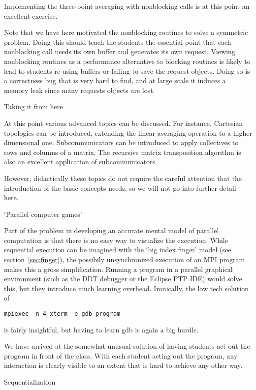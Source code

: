 Implementing the three-point averaging with nonblocking calls
is at this point an excellent exercise.

Note that we have here motivated the nonblocking
routines to solve a symmetric problem. Doing this should 
teach the students the essential point that each nonblocking
call needs its own buffer and generates its own request.
Viewing nonblocking routines as a performance alternative to blocking
routines is likely to lead to students re-using buffers or failing to
save the request objects.
Doing so is a correctness bug that is very hard to find, and
at large scale it induces a memory leak since many requests objects
are lost.

 {Taking it from here}

At this point various advanced topics can be discussed. For instance,
Cartesian topologies can be introduced, extending the linear averaging operation
to a higher dimensional one.
Subcommunicators can be introduced to apply collectives to rows and
columns of a matrix. The recursive matrix transposition algorithm is also
an excellent application of subcommunicators.

However, didactically these topics do not require the careful
attention that the introduction of the basic concepts needs, so we
will not go into further detail here.

 {`Parallel computer games'}
\label{sec:games}

Part of the problem in developing an accurate mental model of parallel
computation is that there is no easy way to visualize the execution.
While sequential execution can be imagined with the `big index finger'
model (see section~\ref{sec:finger}), the possibily unsynchronized
execution of an MPI program makes this a gross simplification.
Running a program in a parallel graphical environment (such as the DDT
debugger or the Eclipse PTP IDE) would solve this, but they introduce
much learning overhead. Ironically, the low tech solution of
\begin{verbatim}
mpiexec -n 4 xterm -e gdb program
\end{verbatim}
is fairly insightful, but having to learn gdb is again a big hurdle.

We have arrived at the somewhat unusual solution of having students
act out the program in front of the class. With each student acting
out the program, any interaction is clearly visible to an extent that
is hard to achieve any other way.

 {Sequentialization}
\label{sec:seq-game}

